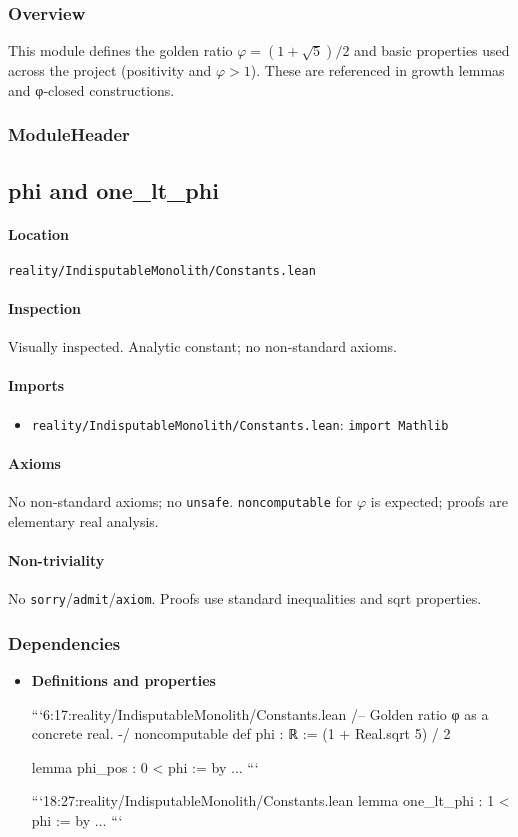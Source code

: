 \documentclass{article}
\newcommand{\FileRef}[1]{\texttt{#1}}
\newcommand{\ModuleHeader}[3]{%
  \subsection{#1}
  \paragraph{Location} \FileRef{#2}\\
  \paragraph{Inspection} #3
}
\begin{document}
\subsubsection{Overview}
This module defines the golden ratio \(\varphi=(1+\sqrt{5})/2\) and basic properties used across the project (positivity and \(\varphi>1\)). These are referenced in growth lemmas and φ‑closed constructions.

\subsubsection{ModuleHeader}
\ModuleHeader{phi and one\_lt\_phi}{reality/IndisputableMonolith/Constants.lean}{Visually inspected. Analytic constant; no non‑standard axioms.}

\paragraph{Imports}
\begin{itemize}[leftmargin=*]
  \item \FileRef{reality/IndisputableMonolith/Constants.lean}: \texttt{import Mathlib}
\end{itemize}

\paragraph{Axioms}
No non‑standard axioms; no \texttt{unsafe}. \texttt{noncomputable} for \(\varphi\) is expected; proofs are elementary real analysis.

\paragraph{Non-triviality}
No \texttt{sorry}/\texttt{admit}/\texttt{axiom}. Proofs use standard inequalities and sqrt properties.

\subsubsection{Dependencies}
\begin{itemize}[leftmargin=*]
  \item \textbf{Definitions and properties}

```6:17:reality/IndisputableMonolith/Constants.lean
/-- Golden ratio φ as a concrete real. -/
noncomputable def phi : ℝ := (1 + Real.sqrt 5) / 2

lemma phi_pos : 0 < phi := by ...
```

```18:27:reality/IndisputableMonolith/Constants.lean
lemma one_lt_phi : 1 < phi := by
  ...
```
\end{itemize}
\end{document}
